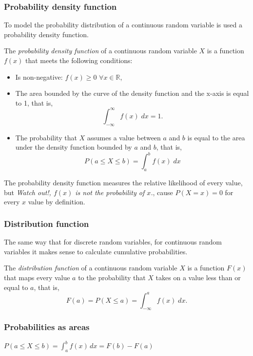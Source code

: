 \begin{frame}
\frametitle{Probability density function}
To model the probability distribution of a continuous random variable is used a probability density function.

\begin{definition}
The \emph{probability density function} of a continuous random variable $X$ is a function $f(x)$ that meets the
following conditions:
\begin {itemize}
\item Is non-negative: $f(x)\geq 0$ $\forall x\in \mathbb{R}$,
\item The area bounded by the curve of the density function and the x-axis is equal to 1, that is,
\[
\int_{-\infty}^{\infty} f(x)\; dx = 1.
\]
\item The probability that $X$ assumes a value between $a$ and $b$ is equal to the area under the density function
bounded by $a$ and $b$, that is,
\[
P(a\leq X\leq b) = \int_a^b f(x)\; dx
\]
\end{itemize}
\end{definition}

The probability density function measures the relative likelihood of every value, but \alert{\emph{Watch out!, $f(x)$ is
not the probability of $x$.}}, cause $P(X=x)=0$ for every $x$ value by definition.
\end{frame}


\begin{frame}
\frametitle{Distribution function}
The same way that for discrete random variables, for continuous random variables it makes sense to calculate cumulative
probabilities.
\begin{definition}
The \emph{distribution function} of a continuous random variable $X$ is a function $F(x)$ that maps every value $a$ to
the probability that $X$ takes on a value less than or equal to $a$, that is,
\[
F(a) = P(X\leq a) = \int_{-\infty}^{a} f(x)\; dx.
\]
\end{definition}

\end{frame}


\begin{frame}
\frametitle{Probabilities as areas}

\begin{center}
$\displaystyle P(a\leq X\leq b) = \int_a^b f(x)\, dx = F(b)-F(a)$
\end{center}
\end{frame}



